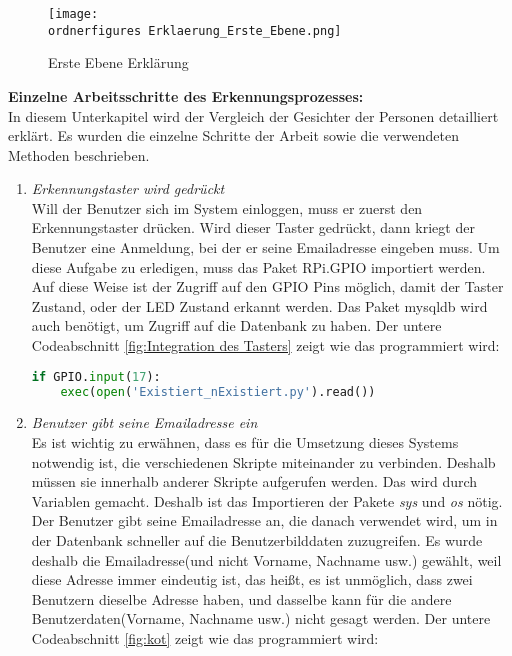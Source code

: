 \begin{figure}[H]
	\texttt{[image: \\ordnerfigures Erklaerung\_Erste\_Ebene.png]}
	\caption{Erste Ebene Erklärung}
	\label{fig:Erklaerung_Erste_Ebene}
\end{figure}

\textbf{Einzelne Arbeitsschritte des Erkennungsprozesses: }\\

In diesem Unterkapitel wird der Vergleich der Gesichter der Personen detailliert erklärt. Es wurden die einzelne Schritte der Arbeit sowie die verwendeten Methoden beschrieben.

\begin{enumerate}
	
	\item \textit{Erkennungstaster wird gedr{\"u}ckt} \\
	
	Will der Benutzer sich im System einloggen, muss er zuerst den Erkennungstaster dr{\"u}cken. Wird dieser Taster gedr{\"u}ckt, dann kriegt der Benutzer eine Anmeldung, bei der er seine Emailadresse eingeben muss. Um diese Aufgabe zu erledigen, muss das Paket RPi.GPIO importiert werden. Auf diese Weise ist der Zugriff auf den GPIO Pins m{\"o}glich, damit der Taster Zustand, oder der LED Zustand erkannt werden. Das Paket mysqldb wird auch ben{\"o}tigt, um Zugriff auf die Datenbank zu haben. Der untere Codeabschnitt \ref{fig:Integration des Tasters} zeigt wie das programmiert wird: 
	\begin{lstlisting}[caption={Integration des Tasters}, label={fig:Integration des Tasters}, language=Python]
	if GPIO.input(17):
	exec(open('Existiert_nExistiert.py').read()) 
	\end{lstlisting} 
	\item \textit{Benutzer gibt seine Emailadresse ein} \\
	
Es ist wichtig zu erw{\"a}hnen, dass es für die Umsetzung dieses Systems notwendig ist, die verschiedenen Skripte miteinander zu verbinden.  Deshalb müssen sie innerhalb anderer Skripte aufgerufen werden. Das wird durch Variablen gemacht. Deshalb ist das Importieren der Pakete \textit{sys} und \textit{os} n{\"o}tig. Der Benutzer gibt seine Emailadresse an, die danach verwendet wird, um in der Datenbank schneller auf die Benutzerbilddaten zuzugreifen. Es wurde deshalb die Emailadresse(und nicht Vorname, Nachname usw.) gewählt, weil diese Adresse immer eindeutig ist, das heißt, es ist unmöglich, dass zwei Benutzern dieselbe Adresse haben, und dasselbe kann für die andere Benutzerdaten(Vorname, Nachname usw.) nicht gesagt werden. Der untere Codeabschnitt \ref{fig:kot} zeigt wie das programmiert wird: 


\end{enumerate}
